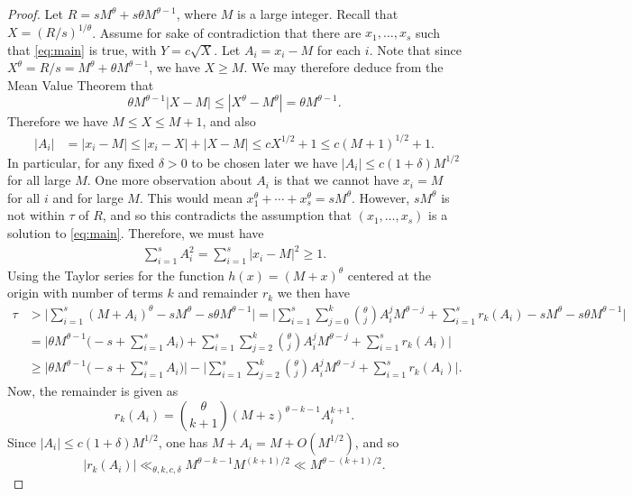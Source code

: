 \documentclass[10pt,a4paper]{amsart}
\begin{document}
\begin{proof} Let $R = sM^{\theta}+s\theta M^{\theta-1}$, where $M$ is a large integer. Recall that $X = (R/s)^{1/\theta}$. Assume for sake of contradiction that there are $x_1,\ldots, x_s$ such that \eqref{eq:main} is true, with $Y = c\sqrt{X}$. Let $A_i = x_i-M$ for each $i$. Note that since $X^{\theta}= R/s = M^{\theta}+\theta M^{\theta-1}$, we have $X \geq M$. We may therefore deduce from the Mean Value Theorem that 
\[ \theta M^{\theta-1}|X-M| \leq |X^{\theta}-M^{\theta}| = \theta M^{\theta-1}. \]
Therefore we have $M \leq X \leq M+1$, and also 
\begin{align*} 
|A_i| & = |x_i-M| \leq |x_i-X|+|X-M| \leq  cX^{1/2} +1 \leq c(M+1)^{1/2}+1.
\end{align*}
In particular, for any fixed $\delta > 0$ to be chosen later we have $|A_i| \leq c(1+\delta)M^{1/2}$ for all large $M$. 
One more observation about $A_i$ is that we cannot have $x_i = M$ for all $i$ and for large $M$. This would mean $x_1^{\theta}+\cdots +x_s^{\theta} = sM^{\theta}$. However, $sM^{\theta}$ is not within $\tau$ of $R$, and so this contradicts the assumption that $(x_1,\ldots,x_s)$ is a solution to \eqref{eq:main}. Therefore, we must have 
\begin{align} \label{eq:A_i}
\sum_{i=1}^s A_i^2 = \sum_{i=1}^s |x_i-M|^2 \geq 1. 
\end{align}
Using the Taylor series for the function $h(x) = (M+x)^{\theta}$ centered at the origin with number of terms $k$ and remainder $r_k$ we then have 
\begin{equation} \label{eq:comp}
\begin{aligned}
\tau & > \Big|\sum_{i=1}^s (M+A_i)^{\theta}-sM^{\theta}-s\theta M^{\theta-1}\Big| = \Big|\sum_{i=1}^s \sum_{j=0}^k \binom{\theta}{j}A_i^{j}M^{\theta-j}+\sum_{i=1}^s r_k(A_i)-sM^{\theta}-s\theta M^{\theta-1}\Big| 
\\ & = \Big|\theta M^{\theta-1}\big(-s+\sum_{i=1}^s A_i\big)+\sum_{i=1}^s \sum_{j=2}^k \binom{\theta}{j}A_i^jM^{\theta-j}+\sum_{i=1}^s r_k(A_i)\Big| 
\\ & \geq \Big|\theta M^{\theta-1}\big(-s+\sum_{i=1}^s A_i\big)\Big|-\Big|\sum_{i=1}^s \sum_{j=2}^k \binom{\theta}{j}A_i^jM^{\theta-j}+\sum_{i=1}^s r_k(A_i)\Big|. 
\end{aligned}
\end{equation}
Now, the remainder is given as 
\[r_k(A_i) = \binom{\theta}{k+1}(M+z)^{\theta-k-1}A_i^{k+1}. \] Since $|A_i| \leq c(1+\delta)M^{1/2}$, one has $M+A_i = M +O(M^{1/2})$, and so 
\[ |r_k(A_i)| \ll_{\theta,k,c,\delta} M^{\theta-k-1}M^{(k+1)/2} \ll M^{\theta-(k+1)/2}. \] 

\end{proof}
\end{document}
